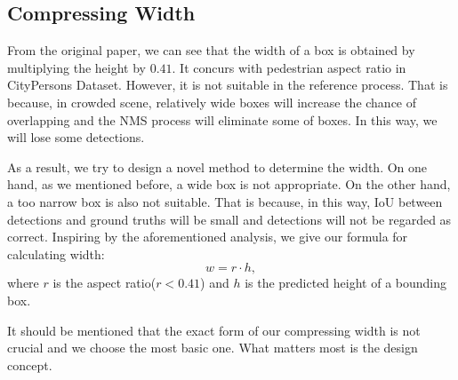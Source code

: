 \documentclass[twocolumn]{article}
\begin{document}
\subsection{Compressing Width}
From the original paper\cite{liu2019high}, we can see that the width of a box is obtained by multiplying the height by $0.41$. It concurs with pedestrian aspect ratio in CityPersons Dataset\cite{zhang2017citypersons}. However, it is not suitable in the reference process. That is because, in crowded scene, relatively wide boxes will increase the chance of overlapping and the NMS process will eliminate some of boxes. In this way, we will lose some detections.\par 
As a result, we try to design a novel method to determine the width. On one hand, as we mentioned before, a wide box is not appropriate. On the other hand, a too narrow box is also not suitable. That is because, in this way, IoU between detections and ground truths will be small and detections will not be regarded as correct. 
Inspiring by the aforementioned analysis, we give our formula for calculating width:
\[w = r \cdot h,\]
where $r$ is the aspect ratio($r<0.41$) and $h$ is the predicted height of a bounding box.\par
It should be mentioned that the exact form of our compressing width is not crucial and we choose the most basic one. What matters most is the design concept. 
\end{document}

